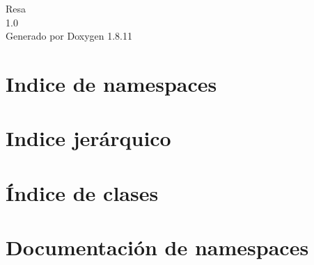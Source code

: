 \documentclass[twoside]{book}
\newcommand{\+}{\discretionary{\mbox{\scriptsize$\hookleftarrow$}}{}{}}
\newcommand{\clearemptydoublepage}{%
  \newpage{\pagestyle{empty}\cleardoublepage}%
}
\begin{document}
\begin{titlepage}
\vspace*{7cm}
\begin{center}%
{\Large Resa \\[1ex]\large 1.\+0 }\\
\vspace*{1cm}
{\large Generado por Doxygen 1.8.11}\\
\end{center}
\end{titlepage}
\clearemptydoublepage
\tableofcontents
\clearemptydoublepage
{}

\chapter{Indice de namespaces}

\chapter{Indice jerárquico}

\chapter{Índice de clases}

\chapter{Documentación de namespaces}











\end{document}
